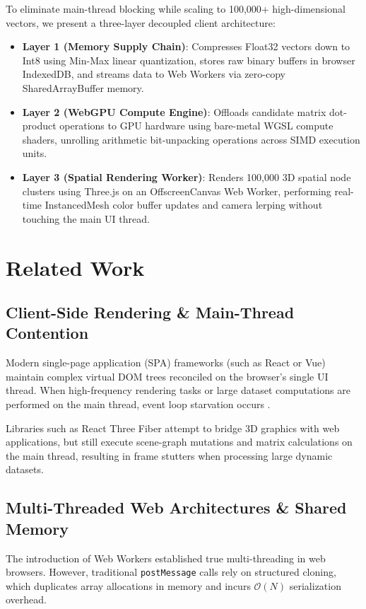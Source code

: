 \documentclass[fleqn,10pt,lineno]{wlpeerj}
\begin{document}
To eliminate main-thread blocking while scaling to 100,000+ high-dimensional vectors, we present a three-layer decoupled client architecture:
\begin{itemize}[noitemsep]
\item \textbf{Layer 1 (Memory Supply Chain)}: Compresses Float32 vectors down to Int8 using Min-Max linear quantization, stores raw binary buffers in browser IndexedDB, and streams data to Web Workers via zero-copy SharedArrayBuffer memory.
\item \textbf{Layer 2 (WebGPU Compute Engine)}: Offloads candidate matrix dot-product operations to GPU hardware using bare-metal WGSL compute shaders, unrolling arithmetic bit-unpacking operations across SIMD execution units.
\item \textbf{Layer 3 (Spatial Rendering Worker)}: Renders 100,000 3D spatial node clusters using Three.js on an OffscreenCanvas Web Worker, performing real-time InstancedMesh color buffer updates and camera lerping without touching the main UI thread.
\end{itemize}

\section*{Related Work}

\subsection*{Client-Side Rendering \& Main-Thread Contention}
Modern single-page application (SPA) frameworks (such as React or Vue) maintain complex virtual DOM trees reconciled on the browser's single UI thread. When high-frequency rendering tasks or large dataset computations are performed on the main thread, event loop starvation occurs \citep{verkleij2021browser}. 

Libraries such as React Three Fiber attempt to bridge 3D graphics with web applications, but still execute scene-graph mutations and matrix calculations on the main thread, resulting in frame stutters when processing large dynamic datasets.

\subsection*{Multi-Threaded Web Architectures \& Shared Memory}
The introduction of Web Workers established true multi-threading in web browsers. However, traditional \texttt{postMessage} calls rely on structured cloning, which duplicates array allocations in memory and incurs $\mathcal{O}(N)$ serialization overhead. 
\end{document}
